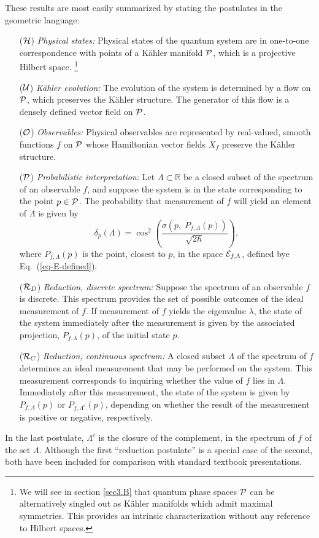 \documentclass[12pt,aps,eqsecnum,tighten,nofootinbib]{revtex4-2}
\def\P{{\cal P}}
\newcommand{\eqn}[1]{Eq.~(\ref{#1})}
\def\Bbb{}
\def\R{\mathbb R}
\begin{document}
These results are most easily summarized by stating the postulates in
the geometric language:
%
\begin{itemize}
\item[(${\cal H}$)] {\it Physical states: } Physical states of the
quantum system are in one-to-one correspondence with points of a
K\"ahler manifold ${\cal P}$, which is a projective Hilbert space.%
%
\footnote{We will see in section \ref{sec3.B} that quantum phase
spaces $\P$ can be alternatively singled out as K\"ahler manifolds
which admit maximal symmetries.  This provides an intrinsic
characterization without any reference to Hilbert spaces.}
%
\item[(${\cal U}$)] {\it K\"ahler evolution: } The evolution of the
system is determined by a flow on $\P$, which preserves the K\"ahler
structure. The generator of this flow is a densely defined vector
field on $\P$.
%
\item[(${\cal O}$)] {\it Observables: } Physical observables are
represented by real-valued, smooth functions $f$ on $\P$ whose
Hamiltonian vector fields $X_f$ preserve the K\"ahler structure.
%
\item[(${\cal P}$)] {\it Probabilistic interpretation: } Let $\Lambda
\subset \R$ be a closed subset of the spectrum of an observable $f$,
and suppose the system is in the state corresponding to the point $p
\in \P$.  The probability that measurement of $f$ will yield an
element of $\Lambda$ is given by
%
\begin{equation}
\delta_p(\Lambda) = \cos^2\left(\frac {\sigma(p, \;{\Bbb P}_{f,\Lambda}
(p))} {\sqrt{2\hbar}} \right),
\end{equation}
%	
where ${\Bbb P}_{f,\Lambda}(p)$ is the point, closest to $p$, in the
space ${\cal E}_{f, \Lambda}$, defined bye \eqn{eq-E-defined}.
%
\item[(${\cal R}_D$)] {\it Reduction, discrete spectrum: } Suppose the
spectrum of an observable $f$ is discrete.  This spectrum provides the
set of possible outcomes of the ideal measurement of $f$.  If
measurement of $f$ yields the eigenvalue $\lambda$, the state of the
system immediately after the measurement is given by the associated
projection, ${\Bbb P}_{f,\lambda}(p)$, of the initial state $p$.
%
\item[(${\cal R}_C$)] {\it Reduction, continuous spectrum: } A closed
subset $\Lambda$ of the spectrum of $f$ determines an ideal
measurement that may be performed on the system.  This measurement
corresponds to inquiring whether the value of $f$ lies in $\Lambda$.
Immediately after this measurement, the state of the system is given
by ${\Bbb P}_{f,\Lambda}(p)$ or ${\Bbb P}_{f,\Lambda^c}(p)$, depending
on whether the result of the measurement is positive or negative,
respectively.
\end{itemize}
%
In the last postulate, $\Lambda^c$ is the closure of the complement,
in the spectrum of $f$ of the set $\Lambda$.  Although the first
``reduction postulate''  is a special case of the second, both have
been included for comparison with standard textbook presentations.
\end{document}
